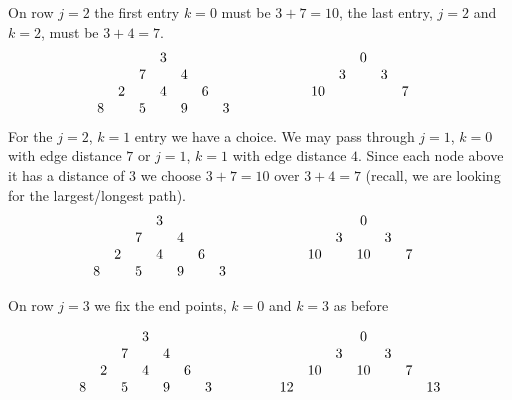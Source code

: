 \documentclass[oneside,12pt]{book}   	%
\theoremstyle{definition}
\begin{document}
\begin{spacing}{1.618}
			On row $j=2$ the first entry $k=0$ must be $3+7=10$, the last entry, $j=2$ and $k=2$, must be $3+4=7$. 
			\begin{alignat}{4}
				\begin{array}{ccccccc}
					&&&{3}&&& \\
					&&{7}&& 4&& \\
					&2&&{4}&& 6& \\
					8 && 5 && {9} && 3
				\end{array} &\hspace{1 cm}&\begin{array}{ccccccc}
					&&& 0 \\
					&& 3 && 3\\
					& 10 & && & 7 \\
					&&&&&&
				\end{array}
			\end{alignat}
			For the $j=2$, $k=1$ entry we have a choice. We may pass through $j=1$, $k=0$ with edge distance $7$ or $j=1$, $k=1$ with edge distance $4$. Since each node above it has a distance of $3$ we choose $3+7=10$ over $3+4=7$ (recall, we are looking for the largest/longest path). 
			\begin{alignat}{4}
				\begin{array}{ccccccc}
					&&&{3}&&& \\
					&&{7}&& 4&& \\
					&2&&{4}&& 6& \\
					8 && 5 && {9} && 3
				\end{array} &\hspace{1 cm}&\begin{array}{ccccccc}
					&&& 0 \\
					&& 3 && 3\\
					& 10 & &10 & & 7 \\
					&&&&&&
				\end{array}
			\end{alignat}

			On row $j=3$ we fix the end points, $k=0$ and $k=3$ as before
			
			\begin{alignat}{4}
				\begin{array}{ccccccc}
					&&&{3}&&& \\
					&&{7}&& 4&& \\
					&2&&{4}&& 6& \\
					8 && 5 && {9} && 3
				\end{array} &\hspace{1 cm}&\begin{array}{ccccccc}
					&&& 0 \\
					&& 3 && 3\\
					& 10 & &10 & & 7 \\
					12 &&&&& &13 
				\end{array}
			\end{alignat}
			

\end{spacing}
\end{document}
